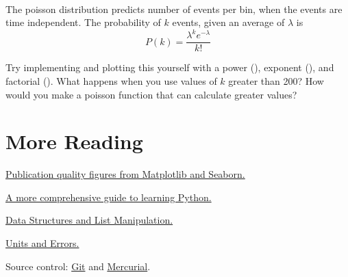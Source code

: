 \documentclass[justified, nobib]{tufte-handout}
\newcommand{\listTutorialLink}
  {https://docs.python.org/2/tutorial/datastructures.html}
\newcommand{\pintLink}{http://pint.readthedocs.org/en/0.6/}
\newcommand{\hgLink}{http://mercurial.selenic.com/}
\newcommand{\gitLink}{http://git-scm.com/}
\newcommand{\lambdaTutorialLink}
  {https://pythonconquerstheuniverse.wordpress.com/2011/08/29/lambda_tutorial/}
\newcommand{\functionalProgrammingLink}
  {http://www.ibm.com/developerworks/library/l-prog/}
\begin{document}
 \\
The poisson distribution predicts number of events per bin, when the events are time independent. The probability of $k$ events, given an average of $\lambda$ is
$$ P(k) = \frac{\lambda^k e^{-\lambda}}{k!} $$

\noindent
Try implementing and plotting this yourself with a power (), exponent (), and factorial ().
What happens when you use values of $k$ greater than 200?
How would you make a poisson function that can calculate greater values?
\pagebreak

\section*{More Reading}
\begin{description}
\item \href{http://www.jesshamrick.com/2016/04/13/reproducible-plots/}{Publication quality figures from Matplotlib and Seaborn.}

\item \href{http://learnpythonthehardway.org/book/}{A more comprehensive guide to learning Python.}

\item \href{\listTutorialLink}{Data Structures and List Manipulation.}

\item \href{\pintLink}{Units and Errors.}

\item Source control: \href{\gitLink}{Git} and \href{\hgLink}{Mercurial}.


\end{description}
\end{document}
